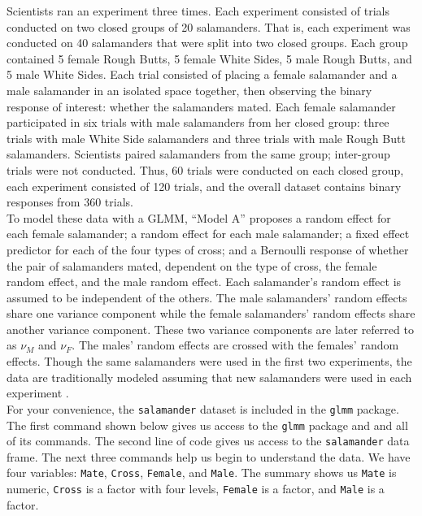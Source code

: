 \documentclass[article]{jss}
\begin{document}
Scientists ran an experiment three times. Each experiment consisted of trials conducted on two closed groups of 20 salamanders. That is, each experiment was conducted on 40 salamanders that were split into two closed groups.  Each group contained 5 female Rough Butts, 5 female White Sides, 5 male Rough Butts, and 5 male White Sides.  Each trial consisted of placing a  female salamander and a  male salamander in an isolated space together, then observing the binary response of interest: whether the salamanders mated.  Each female salamander participated in six trials with male salamanders from her closed group:  three trials with male White Side salamanders and three trials with male Rough Butt salamanders. Scientists paired salamanders from the same group; inter-group trials were not conducted. Thus, 60 trials were conducted on each closed group, each experiment consisted of 120 trials, and the overall dataset contains binary responses from 360 trials. \\


 To model these data with a GLMM,  ``Model A'' \citep{karim:zeger:1992} proposes
a random effect for each female salamander; a random effect for each male salamander; a fixed effect predictor for each of the four types of cross; and a Bernoulli response of whether the pair of salamanders mated, dependent on the type of cross, the female random effect, and the male random effect. 
 Each salamander's random effect is assumed to be independent of the others.  The male salamanders' random effects share one variance component  while the female salamanders' random effects share another variance component. These two variance components are later referred to as $\nu_M$ and $\nu_F$. The males' random effects are crossed with the females' random effects. Though the same salamanders were used in the first two experiments, the data are traditionally modeled assuming that new salamanders were used in each experiment \citep{booth:hobert:1999,  karim:zeger:1992,  mcc:nelder:1989}.\\

 For your convenience, the \texttt{salamander} dataset is  included in the \texttt{glmm} package. The first   command shown below gives us access to the \texttt{glmm} package and and all of its commands. The second line of code gives us access to the \texttt{salamander} data frame.  The next three commands help us begin to understand the data. We have four variables: \texttt{Mate}, \texttt{Cross}, \texttt{Female}, and \texttt{Male}. The summary shows us \texttt{Mate} is numeric, \texttt{Cross} is a factor with four levels, \texttt{Female} is a factor, and \texttt{Male} is a factor. 
\end{document}
